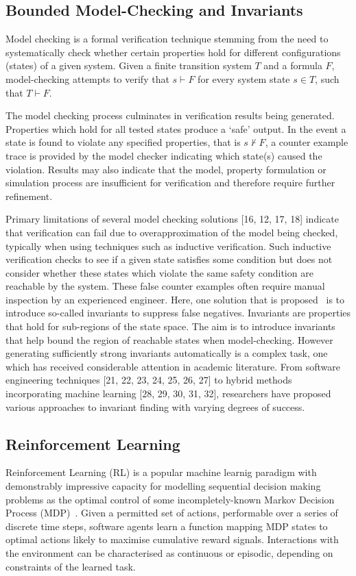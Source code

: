 \documentclass[runningheads]{llncs}
\begin{document}
\subsection{Bounded Model-Checking and Invariants}

Model checking is a formal verification technique stemming from the need to systematically
check whether certain properties hold for different configurations (states) of a given system.
Given a finite transition system $T$ and a formula $F$, model-checking attempts to verify
that $s \vdash F$ for every system state $s \in T$, such that $T \vdash F$. 

The model checking process culminates in verification results being generated. Properties which hold for all tested states
produce a ‘safe’ output. In the event a state is found to violate any specified properties, that 
is $s \nvdash F$, a counter example trace is provided by the model checker indicating which state(s)
caused the violation. Results may also indicate that the model, property formulation or
simulation process are insufficient for verification and therefore require further refinement.

Primary limitations of several model checking solutions [16, 12, 17, 18] indicate that verification can fail due to overapproximation of the model being checked, typically when using techniques such as inductive verification\cite{}. Such inductive verification checks to see if a given state satisfies
some condition but does not consider whether these states which violate
the same safety condition are reachable by the system. These false counter examples often require manual inspection by an
experienced engineer. Here, one solution that is proposed~\cite{1688959} is to introduce so-called invariants to suppress false negatives. Invariants are properties that hold for sub-regions of the state space. The aim is to introduce invariants that help bound the region of reachable states when model-checking. However generating sufficiently strong invariants automatically is a complex task, one which has received considerable attention in academic
literature. From software engineering techniques [21, 22, 23, 24, 25, 26, 27] to hybrid methods incorporating machine learning [28, 29, 30, 31, 32], researchers have proposed various approaches to invariant finding with varying degrees of success.

\subsection{Reinforcement Learning}
Reinforcement Learning (RL) is a popular machine learnig paradigm with demonstrably impressive capacity for modelling sequential decision making problems as the optimal control of some incompletely-known Markov Decision Process (MDP)~\cite{sutton2018reinforcement}. Given a permitted set of actions, performable over a series of discrete time steps, software agents learn a function mapping MDP states to optimal actions likely to maximise cumulative reward signals. Interactions with the environment can be characterised as continuous or episodic, depending on constraints of the learned task.
 
\end{document}
